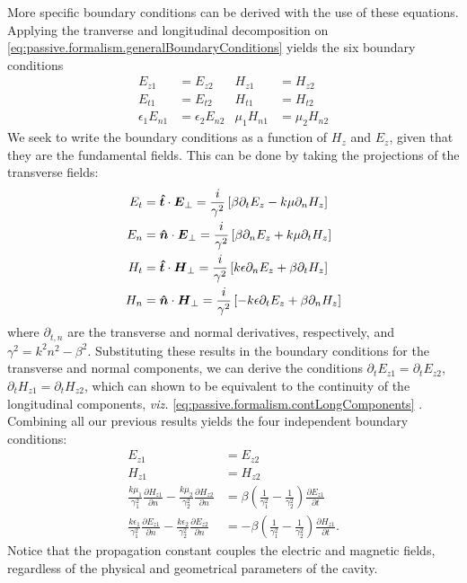 More specific boundary conditions can be derived with the use of these equations.
Applying the tranverse and longitudinal decomposition on \eqref{eq:passive.formalism.generalBoundaryConditions}
yields the six boundary conditions
  \begin{align*}
   E_{z1}		&= E_{z2}		& H_{z1}	&= H_{z2}	\label{eq:passive.formalism.contLongComponents}\\
   E_{t1}		&= E_{t2}		& H_{t1}	&= H_{t2}	\\
   \epsilon_1E_{n1}	&= \epsilon_2E_{n2}	& \mu_1H_{n1}	&= \mu_2H_{n2}
  \end{align*}
We seek to write the boundary conditions as a function of $H_z$ and $E_z$,
given that they are the fundamental fields. This can be done by taking
the projections of the transverse fields:
  \begin{subequations}
  \begin{align}
   E_t	&= \boldsymbol{\hat{t}}\cdot\boldsymbol{E}_\perp = \frac{i}{\gamma^2}\left[\beta\partial_tE_z-k\mu\partial_nH_z\right]	\\
   E_n	&= \boldsymbol{\hat{n}}\cdot\boldsymbol{E}_\perp = \frac{i}{\gamma^2}\left[\beta\partial_nE_z+k\mu\partial_tH_z\right]	\\
   H_t	&= \boldsymbol{\hat{t}}\cdot\boldsymbol{H}_\perp = \frac{i}{\gamma^2}\left[k\epsilon\partial_nE_z+\beta\partial_tH_z\right]	\\
   H_n	&= \boldsymbol{\hat{n}}\cdot\boldsymbol{H}_\perp = \frac{i}{\gamma^2}\left[-k\epsilon\partial_tE_z+\beta\partial_nH_z\right]	
  \end{align}
  \end{subequations}
where $\partial_{t,n}$ are the transverse and normal derivatives, respectively, and $\gamma^2=k^2n^2-\beta^2$.
Substituting these results in the boundary conditions for the transverse and normal components, we can 
derive the conditions $\partial_tE_{z1}=\partial_tE_{z2}$, $\partial_tH_{z1}=\partial_tH_{z2}$, which can 
shown to be equivalent to the continuity of the longitudinal components, 
\textit{viz.} \eqref{eq:passive.formalism.contLongComponents} \cite{SCH2004b}.
Combining all our previous results yields the four independent 
boundary conditions:
  \begin{subequations}
  \label{eq:passive.formalism.cylindricalBoundaryConditions}
  \begin{align}
   E_{z1}	&= E_{z2}	\\
   H_{z1}	&= H_{z2}	\\
   \frac{k\mu_1}{\gamma_1^2}\frac{\partial H_{z1}}{\partial n}-\frac{k\mu_2}{\gamma_2^2}\frac{\partial H_{z2}}{\partial n} & = \beta\left(\frac{1}{\gamma_1^2}-\frac{1}{\gamma_2^2}\right)\frac{\partial E_{z1}}{\partial t}\\
   \frac{k\epsilon_1}{\gamma_1^2}\frac{\partial E_{z1}}{\partial n}-\frac{k\epsilon_2}{\gamma_2^2}\frac{\partial E_{z2}}{\partial n} & = -\beta\left(\frac{1}{\gamma_1^2}-\frac{1}{\gamma_2^2}\right)\frac{\partial H_{z1}}{\partial t}.
  \end{align}
  \end{subequations}
Notice that the propagation constant couples the electric 
and magnetic fields, regardless of the physical and geometrical
parameters of the cavity. 

